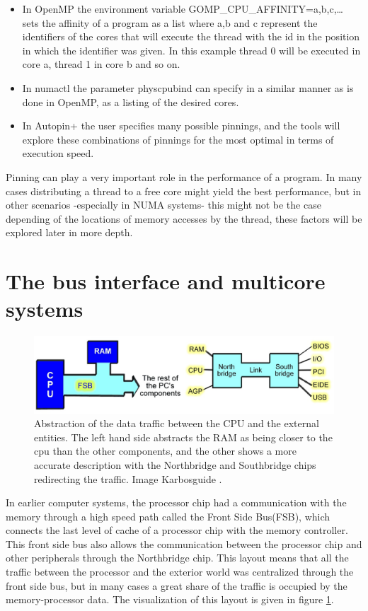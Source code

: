 \begin{itemize}
	\item In OpenMP the environment variable GOMP\_CPU\_AFFINITY=a,b,c,… sets the affinity of a program as a list where a,b and c represent the identifiers of the cores that will execute the thread with the id in the position in which the identifier was given. In this example thread 0 will be executed in core a, thread 1 in core b and so on.
	\item In numactl the parameter physcpubind can specify in a similar manner as is done in OpenMP, as a listing of the desired cores.
	\item In Autopin+ the user specifies many possible pinnings, and the tools will explore these combinations of pinnings for the most optimal in terms of execution speed.
\end{itemize}
Pinning can play a very important role in the performance of a program. In many cases distributing a thread to a free core might yield the best performance, but in other scenarios -especially in NUMA systems- this might not be the case depending of the locations of memory accesses by the thread, these factors will be explored later in more depth. 

\section{The bus interface and multicore systems}\label{section:businterface}
\begin{figure}
	\centering
		\includegraphics[width=.9\textwidth]{figures/bus-abstraction.eps}
		\caption[bus-abtraction]{Abstraction of the data traffic between the CPU and the external entities. The left hand side abstracts the RAM as being closer to the cpu than the other components, and the other shows a more accurate description with the Northbridge and Southbridge chips redirecting the traffic. Image Karbosguide \cite{pcarch-carbo}. }
		\label{fig:bus-abs}
\end{figure}

In earlier computer systems, the processor chip had a communication with the memory through a high speed path called the Front Side Bus(FSB), which connects the last level of cache of a processor chip with the memory controller. This front side bus also allows the communication between the processor chip and other peripherals through the Northbridge chip. This layout means that all the traffic between the processor and the exterior world was centralized through the front side bus, but in many cases a great share of the traffic is occupied by the memory-processor data. The visualization of this layout is given in figure \ref{fig:bus-abs}. 

